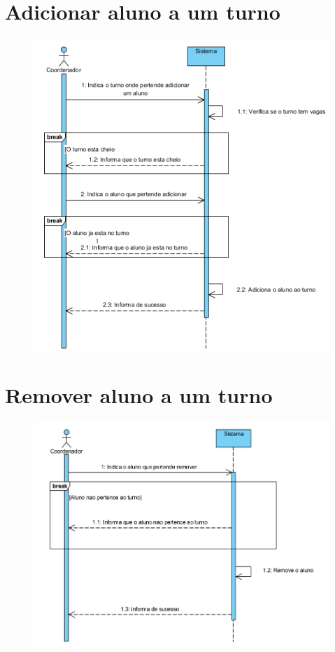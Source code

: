 \documentclass[12pt,a4paper]{report}
\begin{document}
\begin{appendices}
\section{Adicionar aluno a um turno}
\begin{figure}[H]
	\centering 
	\includegraphics[width=\textwidth]{modelacao/use_case_diagram/adicionaaluno.png}  
\end{figure}

\section{Remover aluno a um turno}
\begin{figure}[H]
	\centering 
	\includegraphics[width=\textwidth]{modelacao/use_case_diagram/removealuno.png}  
\end{figure}


\end{appendices}
\end{document}
